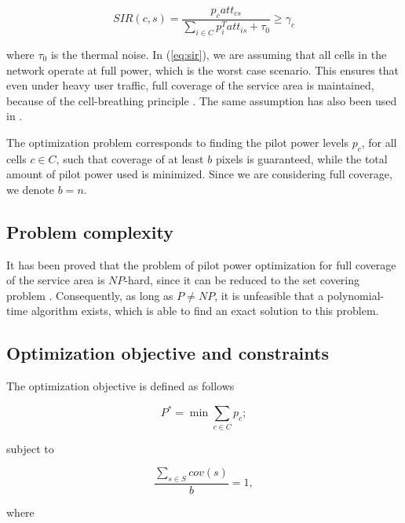 \begin{equation}
SIR(c,s)=\frac{p_{c}att_{cs}}{\sum_{i\in C}p_{i}^{T}att_{is}+\tau_{0}}\ge\gamma_{c}\label{eq:sir}
\end{equation}


where $\tau_{0}$ is the thermal noise. In (\ref{eq:sir}), we are
assuming that all cells in the network operate at full power, which
is the worst case scenario. This ensures that even under heavy user
traffic, full coverage of the service area is maintained, because
of the cell-breathing principle \cite{Holma_WCDMA.for.UMTS:2005}.
The same assumption has also been used in \cite{Siomina:Minimum.pilot.power.for.service.coverage,Chen-Yuan_CPICH.optimization:2008}.

The optimization problem corresponds to finding the pilot power levels
$p_{c}$, for all cells $c\in C$, such that coverage of at least
$b$ pixels is guaranteed, while the total amount of pilot power used
is minimized. Since we are considering full coverage, we denote $b=n$.


\subsection{Problem complexity \label{sub:Problem-complexity}}

It has been proved that the problem of pilot power optimization for
full coverage of the service area is $NP$-hard, since it can be reduced
to the set covering problem \cite{Varbrand_Mathematical.programming.approach:2003}.
Consequently, as long as $P\neq NP$, it is unfeasible that a polynomial-time
algorithm exists, which is able to find an exact solution to this
problem.


\subsection{Optimization objective and constraints}

The optimization objective is defined as follows

\begin{equation}
P^{*}=\min\sum_{c\in C}p_{c};\label{eq:objective_function-1}
\end{equation}


subject to

\begin{equation}
\frac{\sum_{s\in S}cov(s)}{b}=1,\label{eq:coverage_constraint}
\end{equation}


where

